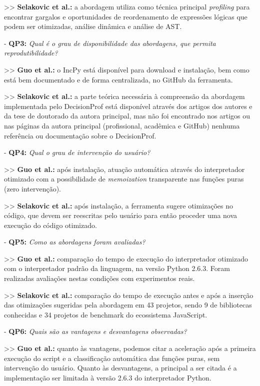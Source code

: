 \documentclass[sigconf]{acmart}
\begin{document}
>> \textbf{Selakovic et al.:} a abordagem utiliza como técnica principal \textit{profiling}  para encontrar gargalos e oportunidades de reordenamento de expressões lógicas que podem ser otimizadas, análise dinâmica e análise de AST.

- \textbf{QP3:} {\textit{Qual é o grau de disponibilidade das abordagens, que permita reprodutibilidade?}}

>> \textbf{Guo et al.:} o IncPy está disponível para download e instalação, bem como está bem documentado e de forma centralizada, no GitHub da ferramenta.

>> \textbf{Selakovic et al.:} a parte teórica necessária à compreensão da abordagem implementada pelo DecisionProf está disponível através dos artigos dos autores e da tese de doutorado da autora principal, mas não foi encontrado nos artigos ou nas páginas da autora principal (profissional, acadêmica e GitHub) nenhuma referência ou documentação sobre o DecisionProf.

- \textbf{QP4:} {\textit{Qual o grau de intervenção do usuário?}}

>> \textbf{Guo et al.:} após instalação, atuação automática através do interpretador otimizado com a possibilidade de \textit{memoization} transparente nas funções puras (zero intervenção).

>> \textbf{Selakovic et al.:} após instalação, a ferramenta sugere otimizações no código, que devem ser reescritas pelo usuário para então proceder uma nova execução do código otimizado.

- \textbf{QP5:} {\textit{Como as abordagens foram avaliadas?}}

>> \textbf{Guo et al.:} comparação do tempo de execução do interpretador otimizado com o interpretador padrão da linguagem, na versão Python 2.6.3. Foram realizadas avaliações nestas condições com experimentos reais.

>> \textbf{Selakovic et al.:} comparação do tempo de execução antes e após a inserção das otimizações sugeridas pela abordagem em 43 projetos, sendo 9 de bibliotecas conhecidas e 34 projetos de benchmark do ecossistema JavaScript.

- \textbf{QP6:} {\textit{Quais são as vantagens e desvantagens observadas?}}

>> \textbf{Guo et al.:} quanto às vantagens, podemos citar a aceleração após a primeira execução do script e a classificação automática das funções puras, sem intervenção do usuário. Quanto às desvantagens, a principal a ser citada é a implementação ser limitada à versão 2.6.3 do interpretador Python.
\end{document}

